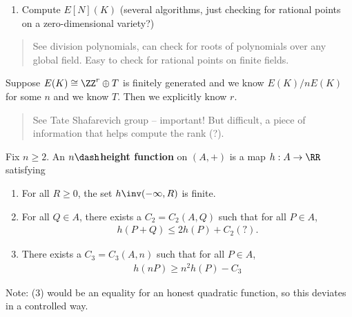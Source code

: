 \begin{enumerate}
\def\labelenumi{\arabic{enumi}.}
\setcounter{enumi}{1}
\tightlist
\item
  Compute \(E[N](K)\) (several algorithms, just checking for rational
  points on a zero-dimensional variety?)
\end{enumerate}

\begin{quote}
See division polynomials, can check for roots of polynomials over any
global field. Easy to check for rational points on finite fields.
\end{quote}

Suppose \(E(K) \cong \ZZ^r \oplus T\) is finitely generated and we know
\(E(K) / nE(K)\) for some \(n\) and we know \(T\). Then we explicitly
know \(r\).

\begin{quote}
See Tate Shafarevich group -- important! But difficult, a piece of
information that helps compute the rank (?).
\end{quote}

\begin{description}
\tightlist
\item[Definition (Height Functions)]
Fix \(n\geq 2\). An \(n\dash\)\textbf{height function} on \((A, +)\) is
a map \(h: A\to \RR\) satisfying
\end{description}

\begin{enumerate}
\def\labelenumi{\arabic{enumi}.}
\item
  For all \(R\geq 0\), the set \(h\inv(-\infty, R)\) is finite.
\item
  For all \(Q\in A\), there exists a \(C_2 = C_2(A, Q)\) such that for
  all \(P \in A\),
  \begin{align*}
    h(P + Q) \leq 2h(P) + C_2
    (?).\end{align*}
\item
  There exists a \(C_3 = C_3(A, n)\) such that for all \(P \in A\),
  \begin{align*}
    h(nP) \geq n^2 h(P) - C_3
    \end{align*}
\end{enumerate}

Note: (3) would be an equality for an honest quadratic function, so this
deviates in a controlled way.


